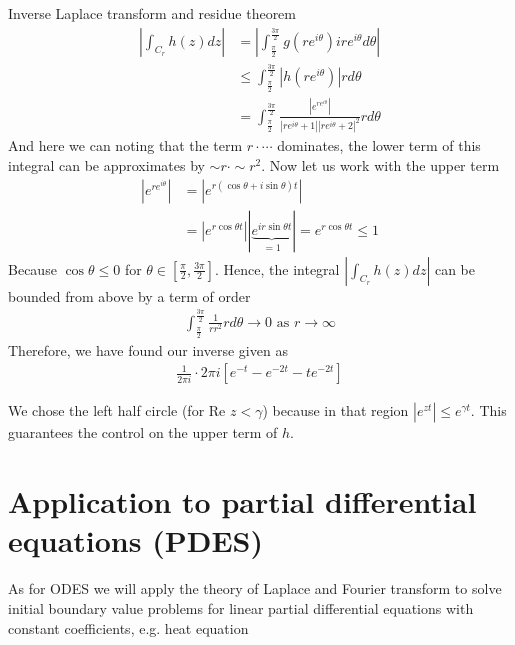 \begin{parag}{Inverse Laplace transform and residue theorem}
	\begin{align*} 
		\left|\int_{C_r}h\left(z\right)dz\right| &= \left|\int_{\frac{\pi}{2}}^{\frac{3\pi}{2}}g\left(re^{i\theta}\right)ire^{i\theta}d \theta\right|\\
												 &\leq \int_{\frac{\pi}{2}}^{\frac{3\pi}{2}}\left|h\left(re^{i\theta}\right)\right|rd \theta\\
												 &= \int_{\frac{\pi}{2}}^{\frac{3\pi}{2}}\frac{\left|e^{re^{i\theta}}\right|}{\left|re^{i\theta} + 1\right|\left|re^{i\theta} + 2\right|^2}r d \theta
	\end{align*}
	And here we can noting that the term $r \cdot  \cdots$ dominates, the lower term of this integral can be approximates by $\sim r \cdot \sim r^2$. Now let us work with the upper term 
	\begin{align*} 
		\left|e^{re^{i\theta}}\right| &= \left|e^{r\left(\cos \theta + i \sin \theta\right)t}\right|\\
		&= \left|e^{r \cos \theta t}\right|\left|\underbrace{e^{ir\sin \theta t}}_{= 1}\right|= e^{r \cos \theta t} \leq 1
	\end{align*}
	Because $\cos \theta \leq 0$ for $\theta \in \left[\frac{\pi}{2}, \frac{3\pi}{2}\right]$. Hence, the integral $\left|\int_{C_r}h\left(z\right)dz\right|$ can be bounded from above by a term of order 
	\begin{align*} 
		\int_{\frac{\pi}{2}}^{\frac{3\pi}{2}} \frac{1}{r r^2}r d \theta \to 0 \text{ as } r \to \infty
	\end{align*}
	Therefore, we have found our inverse given as 
	\begin{align*} 
		\frac{1}{2\pi i} \cdot  2\pi i\left[e^{-t} - e^{-2t} - te^{-2t}\right]
	\end{align*}

\end{parag}


\begin{framedremark}
	We chose the left half circle (for $\text{Re } z < \gamma$) because in that region $\left|e^{zt}\right| \leq e^{\gamma t}$. This guarantees the control on the upper term of $h$.
\end{framedremark}


\chapter{Application to partial differential equations (PDES)}
As for ODES we will apply the theory of Laplace and Fourier transform to solve initial boundary value problems for linear partial differential equations with constant coefficients, e.g. heat equation 

